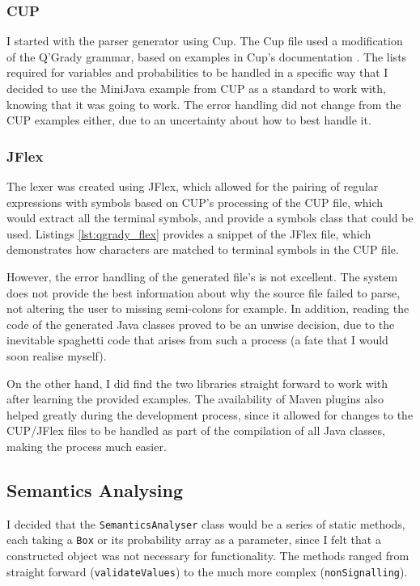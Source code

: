 \documentclass[report.tex]{subfiles}
\begin{document}
\subsubsection{CUP} %
\label{ssub:cup}
I started with the parser generator using Cup. The Cup file used a modification
of the Q'Grady grammar, based on examples in Cup's documentation 
\cite{cup_example}. The lists required for variables and probabilities to be
handled in a specific way that I decided to use the MiniJava example from CUP
as a standard to work with, knowing that it was going to work. The error
handling did not change from the CUP examples either, due to an uncertainty
about how to best handle it.

\subsubsection{JFlex} %
\label{ssub:jflex}
The lexer was created using JFlex, which allowed for the pairing of regular
expressions with symbols based on CUP's processing of the CUP file, which would
extract all the terminal symbols, and provide a symbols class that could be
used. Listings \ref{lst:qgrady_flex} provides a snippet of the JFlex file, which
demonstrates how characters are matched to terminal symbols in the CUP file.

 


However, the error handling of the generated file's is not excellent. The system
does not provide the best information about why the source file failed to parse,
not altering the user to missing semi-colons for example. In addition, reading
the code of the generated Java classes proved to be an unwise decision, due to
the inevitable spaghetti code that arises from such a process (a fate that I
would soon realise myself).

On the other hand, I did find the two libraries straight forward to work with
after learning the provided examples. The availability of Maven plugins also
helped greatly during the development process, since it allowed for changes to
the CUP/JFlex files to be handled as part of the compilation of all Java
classes, making the process much easier.

\subsection{Semantics Analysing} %
\label{sub:semantics_analysing}
I decided that the \texttt{SemanticsAnalyser} class would be a series of static
methods, each taking a \texttt{Box} or its probability array as a parameter,
since I felt that a constructed object was not necessary for functionality. The
methods ranged from straight forward (\texttt{validateValues}) to the much more
complex (\texttt{nonSignalling}).
\end{document}
